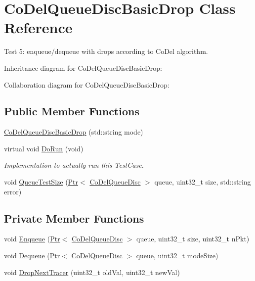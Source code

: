 \hypertarget{classCoDelQueueDiscBasicDrop}{}\section{Co\+Del\+Queue\+Disc\+Basic\+Drop Class Reference}
\label{classCoDelQueueDiscBasicDrop}


Test 5\+: enqueue/dequeue with drops according to Co\+Del algorithm.  




Inheritance diagram for Co\+Del\+Queue\+Disc\+Basic\+Drop\+:


Collaboration diagram for Co\+Del\+Queue\+Disc\+Basic\+Drop\+:
\subsection*{Public Member Functions}
\begin{DoxyCompactItemize}
\item 
\hyperlink{classCoDelQueueDiscBasicDrop_a88078a0c6c97556509510bf10d85eac1}{Co\+Del\+Queue\+Disc\+Basic\+Drop} (std\+::string mode)
\item 
virtual void \hyperlink{classCoDelQueueDiscBasicDrop_ac7338aa80772388f2e8cadb8d975ac13}{Do\+Run} (void)
\begin{DoxyCompactList}\small\item\em Implementation to actually run this Test\+Case. \end{DoxyCompactList}\item 
void \hyperlink{classCoDelQueueDiscBasicDrop_a61137d83489ec151993b89863f9928c4}{Queue\+Test\+Size} (\hyperlink{classns3_1_1Ptr}{Ptr}$<$ \hyperlink{classns3_1_1CoDelQueueDisc}{Co\+Del\+Queue\+Disc} $>$ queue, uint32\+\_\+t size, std\+::string error)
\end{DoxyCompactItemize}
\subsection*{Private Member Functions}
\begin{DoxyCompactItemize}
\item 
void \hyperlink{classCoDelQueueDiscBasicDrop_ab9cfc5b9eee0eaf28cb7f84a7681d08e}{Enqueue} (\hyperlink{classns3_1_1Ptr}{Ptr}$<$ \hyperlink{classns3_1_1CoDelQueueDisc}{Co\+Del\+Queue\+Disc} $>$ queue, uint32\+\_\+t size, uint32\+\_\+t n\+Pkt)
\item 
void \hyperlink{classCoDelQueueDiscBasicDrop_ab858662db8af1c6f181bd0d01d44ce48}{Dequeue} (\hyperlink{classns3_1_1Ptr}{Ptr}$<$ \hyperlink{classns3_1_1CoDelQueueDisc}{Co\+Del\+Queue\+Disc} $>$ queue, uint32\+\_\+t mode\+Size)
\item 
void \hyperlink{classCoDelQueueDiscBasicDrop_adc48228083a11737a0cd3ccf172e6c10}{Drop\+Next\+Tracer} (uint32\+\_\+t old\+Val, uint32\+\_\+t new\+Val)
\end{DoxyCompactItemize}
